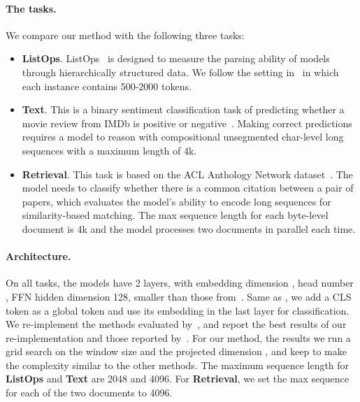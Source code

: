 \paragraph{The tasks.}
We compare our method with the following three tasks: 
\vspace{-0.5em}
\begin{itemize}[leftmargin=1.5em]
    \item \textbf{ListOps}. ListOps~\citep{nangia2018listops} is designed to measure the parsing ability of models through hierarchically structured data. We follow the setting in~\citep{tay2020long} in which each instance contains 500-2000 tokens.
    \item \textbf{Text}. This is a binary sentiment classification task of predicting whether a movie review from IMDb is positive or negative~\citep{maas2011imdb}. Making correct predictions requires a model to reason with compositional unsegmented char-level long sequences with a maximum length of 4k. 
    \item \textbf{Retrieval}. This task is based on the ACL Anthology Network dataset~\citep{radev2013acl}. The model needs to classify whether there is a common citation between a pair of papers, which evaluates the model's ability to encode long sequences for similarity-based matching. The max sequence length for each byte-level document is 4k and the model processes two documents in parallel each time.
\end{itemize}
\vspace{-0.5em}

\paragraph{Architecture.}
On all tasks, the models have 2 layers, with embedding dimension , head number ,
FFN hidden dimension 128, smaller than those from~\citep{tay2020long}. Same as \citep{tay2020long}, we add a CLS token as a global token and use its embedding in the last layer for classification. We re-implement the methods evaluated by~\citet{xiong2021nformer}, and report the best results of our re-implementation and those reported by~\citet{xiong2021nformer}. For our method, the results we run a grid search on the window size  and the projected dimension , and keep  to make the complexity similar to the other methods. The maximum sequence length for \textbf{ListOps} and \textbf{Text} are 2048 and 4096. For \textbf{Retrieval}, we set the max sequence for each of the two documents to 4096.

